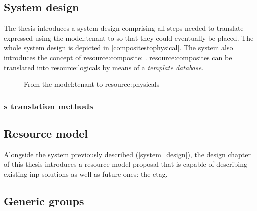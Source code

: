 \subsection{System design} \label{system_design}
The thesis introduces a system design comprising all steps needed to translate  expressed using the \gls{model:tenant} to  so that they could eventually be placed.
The whole system design is depicted in \autoref{compositestophysical}.
The system also introduces the concept of \gls{resource:composite}:
.
\Glspl{resource:composite} can be translated into \glspl{resource:logical} by means of a \textit{template database}.

\newsavebox\compositestophysical \savebox{}
\begin{figure}[!htb]
    \centering
    \usebox{\compositestophysical}
    \caption{From the \gls{model:tenant} to \glspl{resource:physical}}
    \label{compositestophysical}
\end{figure}

\subsubsection{\texorpdfstring{}{Composite}s translation methods}


\subsection{Resource model}
Alongside the system previously described (\autoref{system_design}), the design chapter of this thesis introduces a resource model proposal that is capable of describing existing \gls{inp} solutions as well as future ones: the \gls{etag}.
\newsavebox\tagmodfigure \savebox{}


\subsection{Generic groups}


